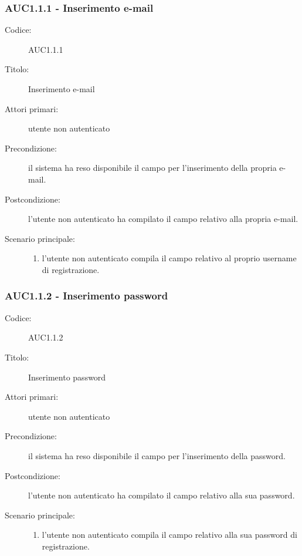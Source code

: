 \documentclass[casi-duso]{subfiles}
\begin{document}
\subsubsection{AUC1.1.1 - Inserimento e-mail}%
\label{subsub:AUC1.1.1}
\begin{description}
  \item[Codice:] AUC1.1.1
  \item[Titolo:] Inserimento e-mail
  \item[Attori primari:] utente non autenticato
  \item[Precondizione:] il sistema ha reso disponibile il campo per l'inserimento della propria e-mail.
  \item[Postcondizione:] l'utente non autenticato ha compilato il campo relativo alla propria e-mail.
  \item[Scenario principale:]
  \begin{enumerate}
    \item l'utente non autenticato compila il campo relativo al proprio username di registrazione.
  \end{enumerate}
\end{description}

\subsubsection{AUC1.1.2 - Inserimento password}%
\label{subsub:AUC1.1.2}
\begin{description}
  \item[Codice:] AUC1.1.2
  \item[Titolo:] Inserimento password
  \item[Attori primari:] utente non autenticato
  \item[Precondizione:] il sistema ha reso disponibile il campo per l'inserimento della password.
  \item[Postcondizione:] l'utente non autenticato ha compilato il campo relativo alla sua password.
  \item[Scenario principale:]
  \begin{enumerate}
    \item l'utente non autenticato compila il campo relativo alla sua password di registrazione.
  \end{enumerate}
\end{description}
\end{document}

